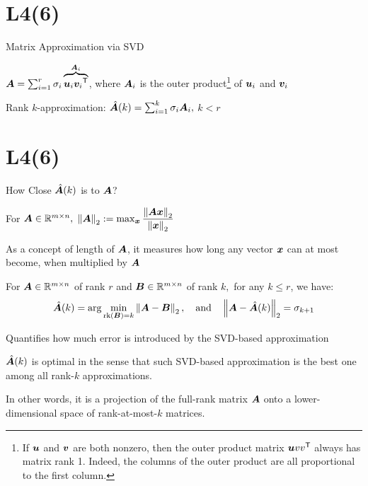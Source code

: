 \documentclass[fleqn,aspectratio=169]{beamer}
\begin{document}
\section{L4(6)}
\begin{frame}{Matrix Approximation via SVD}

\plitemsep 0.1in
\vspace{-0.6cm}
\bci 
\item $\bm{A} = \sum_{i=1}^r \sigma_i \overbrace{\bm{u}_i {\bm{v}_i}^{\mathsf{T}}}^{\bm{A}_i}$, where $\bm{A}_i$ is the outer product\footnote{If $\bm{u}$ and $\bm{v}$ are both nonzero, then the outer product matrix $\bm{u} {vv}^{\mathsf{T}}$ always has matrix rank 1. Indeed, the columns of the outer product are all proportional to the first column.} of $\bm{u}_i$ and $\bm{v}_i$

\item Rank $k$-approximation: $\hat{\bm{A}}(k) = \sum_{i=1}^k \sigma_i \bm{A}_i,$ $k < r$ 
\eci
\end{frame}

\section{L4(6)}
\begin{frame}{How Close $\hat{\bm{A}}(k)$ is to $\bm{A}$?}

\plitemsep 0.07in
\bci 
\item {} {} For $\bm{A} \in {\mathbb R}^{m \times n},$ 
$\left \lVert \bm{A} \right \rVert_2 := \max_{\bm{x}} \dfrac{\left \lVert \bm{A} \bm{x} \right \rVert_2}{\left \lVert \bm{x} \right \rVert_2}$
\bci
\item As a concept of length of $\bm{A}$, it measures how long any vector $\bm{x}$ can at most become, when multiplied by $\bm{A}$
\eci
\item \thm {} For $\bm{A} \in {\mathbb R}^{m \times n}$ of rank $r$ and $\bm{B} \in {\mathbb R}^{m \times n}$ of rank $k,$ for any $k \le r$, we have:
$$
\hat{\bm{A}}(k) = \arg \min_{\text{rk}(\bm{B}) = k} \left \lVert \bm{A} - \bm{B} \right \rVert_2, \quad \text{and} \quad \left \lVert \bm{A} - \hat{\bm{A}}(k) \right \rVert_2 = \sigma_{k+1}
$$
\bci
\item Quantifies how much error is introduced by the SVD-based approximation
\item $\hat{\bm{A}}(k)$ is optimal in the sense that such SVD-based approximation is the best 
one among all rank-$k$ approximations. 

\item In other words, it is a projection of the full-rank matrix $\bm{A}$ onto a lower-dimensional space of rank-at-most-$k$ matrices.
\eci

\eci
\end{frame}
\end{document}
